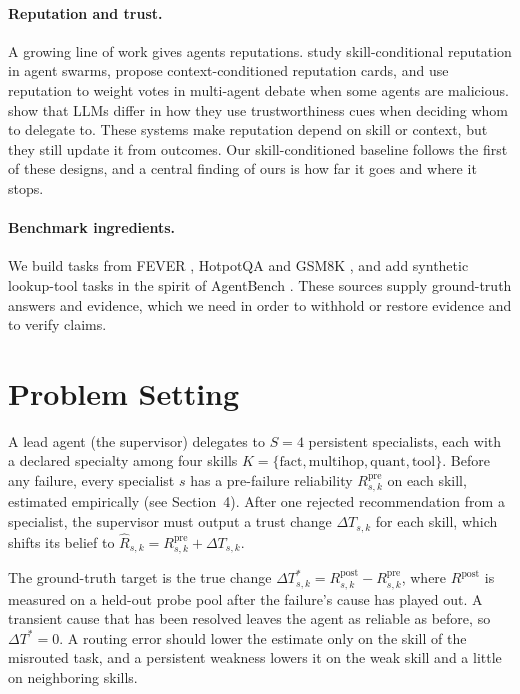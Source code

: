 \documentclass[letterpaper]{article}
\newcommand{\dT}{\Delta T}
\newcommand{\dTs}{\Delta T^{*}}
\begin{document}
\paragraph{Reputation and trust.}
A growing line of work gives agents reputations. \citet{xia2026conditional} study skill-conditional reputation in agent swarms, \citet{chishti2026agentreputation} propose context-conditioned reputation cards, and \citet{zhang2026minirep} use reputation to weight votes in multi-agent debate when some agents are malicious. \citet{plebe2026propensity} show that LLMs differ in how they use trustworthiness cues when deciding whom to delegate to. These systems make reputation depend on skill or context, but they still update it from outcomes. Our skill-conditioned baseline follows the first of these designs, and a central finding of ours is how far it goes and where it stops.

\paragraph{Benchmark ingredients.}
We build tasks from FEVER \citep{thorne2018fever}, HotpotQA \citep{yang2018hotpotqa} and GSM8K \citep{cobbe2021gsm8k}, and add synthetic lookup-tool tasks in the spirit of AgentBench \citep{liu2024agentbench}. These sources supply ground-truth answers and evidence, which we need in order to withhold or restore evidence and to verify claims.

\section{Problem Setting}
A lead agent (the supervisor) delegates to $S=4$ persistent specialists, each with a declared specialty among four skills $K=\{\text{fact},\text{multihop},\text{quant},\text{tool}\}$. Before any failure, every specialist $s$ has a pre-failure reliability $R^{\text{pre}}_{s,k}$ on each skill, estimated empirically (see Section~4). After one rejected recommendation from a specialist, the supervisor must output a trust change $\dT_{s,k}$ for each skill, which shifts its belief to $\hat R_{s,k}=R^{\text{pre}}_{s,k}+\dT_{s,k}$.

The ground-truth target is the true change $\dTs_{s,k}=R^{\text{post}}_{s,k}-R^{\text{pre}}_{s,k}$, where $R^{\text{post}}$ is measured on a held-out probe pool after the failure's cause has played out. A transient cause that has been resolved leaves the agent as reliable as before, so $\dTs=0$. A routing error should lower the estimate only on the skill of the misrouted task, and a persistent weakness lowers it on the weak skill and a little on neighboring skills.
\end{document}
